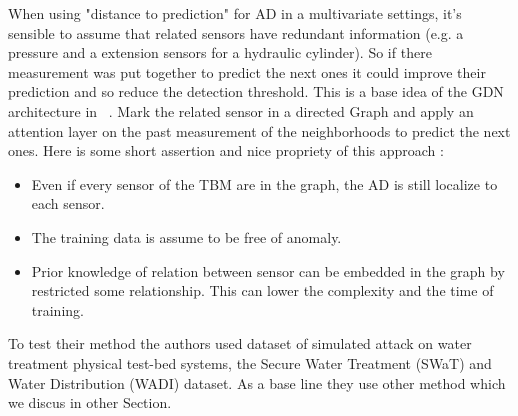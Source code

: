 \documentclass[../description.tex]{subfiles}
\begin{document}
    When using "distance to prediction" for AD in a multivariate settings, it's 
    sensible to assume that related sensors have redundant information 
    (e.g. a pressure and a extension sensors for a hydraulic cylinder).
    So if there measurement was put together to predict the next ones 
    it could improve their prediction and so reduce the detection threshold. This is a base idea of the GDN architecture in ~\cite{Deng2021gdn}.
    Mark the related sensor in a directed Graph
    and apply an attention layer on the past measurement 
    of the neighborhoods to predict the next ones.
    Here is some short assertion and nice propriety of this approach :
    \begin{itemize}
        \item Even if every sensor of the TBM are in the graph, the AD is still localize to each sensor.
        \item The training data is assume to be free of anomaly.
        \item Prior knowledge of relation between sensor can be embedded in the graph by restricted some relationship. 
        This can lower the complexity and the time of training.
    \end{itemize}

    To test their method the authors used dataset of simulated attack on water treatment physical test-bed systems, 
    the Secure Water Treatment (SWaT) and Water Distribution (WADI) dataset. As a base line they use other method which we discus in other Section.
    
\end{document}
